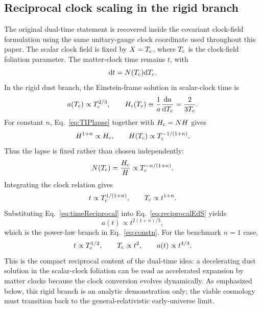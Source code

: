 \documentclass[aps,prd,reprint,nofootinbib,superscriptaddress,longbibliography]{revtex4-2}
\newcommand{\dd}{\mathrm{d}}
\newcommand{\Tc}{T_{\rm c}}
\newcommand{\Hc}{H_{\rm c}}
\begin{document}
\subsection{Reciprocal clock scaling in the rigid branch}

The original dual-time statement is recovered inside the covariant clock-field formulation using the same unitary-gauge clock coordinate used throughout this paper.  The scalar clock field is fixed by $X=\Tc$, where $\Tc$ is the clock-field foliation parameter.  The matter-clock time remains $t$, with
\begin{equation}
  \dd t=N(\Tc)\dd \Tc.
\end{equation}
In the rigid dust branch, the Einstein-frame solution in scalar-clock time is
\begin{equation}
  a(\Tc)\propto \Tc^{2/3},
  \qquad
  \Hc(\Tc)\equiv \frac{1}{a}\frac{\dd a}{\dd \Tc}
  =\frac{2}{3\Tc} .
  \label{eq:reciprocalEdS}
\end{equation}
For constant $n$, Eq.~\eqref{eq:TIPlapse} together with $\Hc=NH$ gives
\begin{equation}
  H^{1+n}\propto \Hc,
  \qquad
  H(\Tc)\propto \Tc^{-1/(1+n)} .
  \label{eq:Hreciprocal}
\end{equation}
Thus the lapse is fixed rather than chosen independently:
\begin{equation}
  N(\Tc)=\frac{\Hc}{H}
  \propto \Tc^{-n/(1+n)} .
  \label{eq:Nreciprocal}
\end{equation}
Integrating the clock relation gives
\begin{equation}
  t\propto \Tc^{1/(1+n)},
  \qquad
  \Tc\propto t^{1+n} .
  \label{eq:timeReciprocal}
\end{equation}
Substituting Eq.~\eqref{eq:timeReciprocal} into Eq.~\eqref{eq:reciprocalEdS} yields
\begin{equation}
  a(t)\propto t^{2(1+n)/3},
  \label{eq:atReciprocal}
\end{equation}
which is the power-law branch in Eq.~\eqref{eq:constn}.  For the benchmark $n=1$ case,
\begin{equation}
  t\propto \Tc^{1/2},
  \qquad
  \Tc\propto t^2,
  \qquad
  a(t)\propto t^{4/3} .
\end{equation}
This is the compact reciprocal content of the dual-time idea: a decelerating dust solution in the scalar-clock foliation can be read as accelerated expansion by matter clocks because the clock conversion evolves dynamically.  As emphasized below, this rigid branch is an analytic demonstration only; the viable cosmology must transition back to the general-relativistic early-universe limit.
\end{document}
